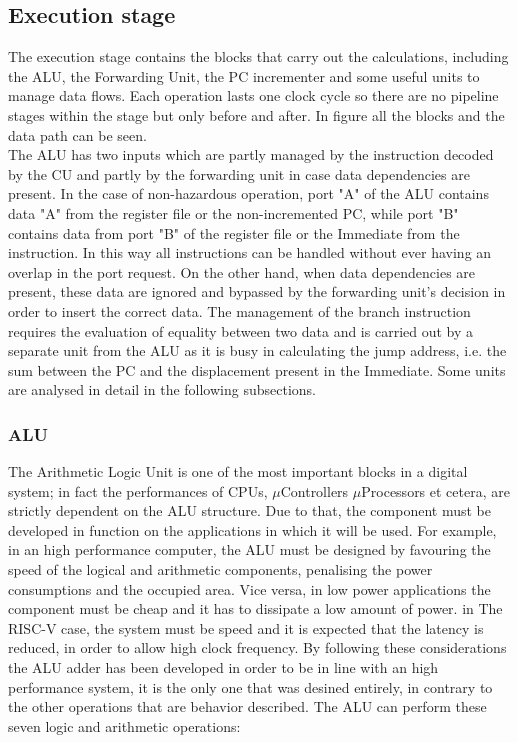 \subsection{Execution stage}
The execution stage contains the blocks that carry out the calculations, including the ALU, the Forwarding Unit, the PC incrementer and some useful units to manage data flows. Each operation lasts one clock cycle so there are no pipeline stages within the stage but only before and after. In figure  all the blocks and the data path can be seen.\\
The ALU has two inputs which are partly managed by the instruction decoded by the CU and partly by the forwarding unit in case data dependencies are present. In the case of non-hazardous operation, port "A" of the ALU contains data "A" from the register file or the non-incremented PC, while port "B" contains data from port "B" of the register file or the Immediate from the instruction. In this way all instructions can be handled without ever having an overlap in the port request. On the other hand, when data dependencies are present, these data are ignored and bypassed by the forwarding unit's decision in order to insert the correct data. The management of the branch instruction requires the evaluation of equality between two data and is carried out by a separate unit from the ALU as it is busy in calculating the jump address, i.e. the sum between the PC and the displacement present in the Immediate. Some units are analysed in detail in the following subsections.

\subsubsection{ALU}
The Arithmetic Logic Unit is one of the most important blocks in a digital system; in fact the performances of CPUs, $\mu$Controllers $\mu$Processors et cetera, are strictly dependent on the ALU structure. Due to that, the component must be developed in function on the applications in which it will be used. For example, in an high performance computer, the ALU must be designed by favouring the speed of the logical and arithmetic components, penalising the power consumptions and the occupied area. Vice versa, in low power applications the component must be cheap and it has to dissipate a low amount of power. in The RISC-V case, the system must be speed and it is expected that the latency is reduced, in order to allow high clock frequency. By following these considerations the ALU adder has been developed in order to be in line with an high performance system, it is the only one that was desined entirely, in contrary to the other operations that are behavior described. The ALU can perform these seven logic and arithmetic operations:

